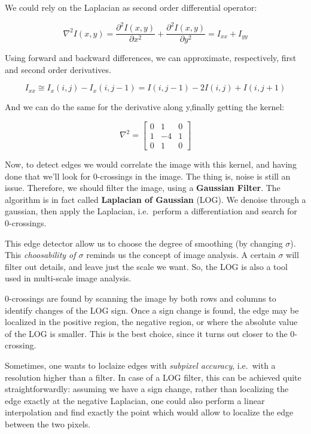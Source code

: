 \documentclass{article}
\begin{document}
We could rely on the Laplacian as second order differential operator:

\[
\nabla^{2} I(x, y)=\frac{\partial^{2} I(x, y)}{\partial x^{2}}+\frac{\partial^{2} I(x, y)}{\partial y^{2}}=I_{x x}+I_{y y}
\]

Using forward and backward differences, we can approximate,
respectively, first and second order derivatives.

\[
I_{x x} \cong I_{x}(i, j)-I_{x}(i, j-1)=I(i, j-1)-2 I(i, j)+I(i, j+1)
\]

And we can do the same for the derivative along y,finally getting the
kernel:

\[
\nabla^{2}=\left[\begin{array}{ccc}
0 & 1 & 0 \\
1 & -4 & 1 \\
0 & 1 & 0
\end{array}\right]
\]

Now, to detect edges we would correlate the image with this kernel, and
having done that we'll look for 0-crossings in the image. The thing is,
noise is still an issue. Therefore, we should filter the image, using a
\textbf{Gaussian Filter}. The algorithm is in fact called
\textbf{Laplacian of Gaussian} (LOG). We denoise through a gaussian,
then apply the Laplacian, i.e.~perform a differentiation and search for
0-crossings.

This edge detector allow us to choose the degree of smoothing (by
changing \(\sigma\)). This \emph{choosability of \(\sigma\)} reminds us
the concept of image analysis. A certain \(\sigma\) will filter out
details, and leave just the scale we want. So, the LOG is also a tool
used in multi-scale image analysis.

0-crossings are found by scanning the image by both rows and columns to
identify changes of the LOG sign. Once a sign change is found, the edge
may be localized in the positive region, the negative region, or where
the absolute value of the LOG is smaller. This is the best choice, since
it turns out closer to the 0-crossing.

Sometimes, one wants to loclaize edges with \emph{subpixel accuracy},
i.e.~with a resolution higher than a filter. In case of a LOG filter,
this can be achieved quite straightforwardly: assuming we have a sign
change, rather than localizing the edge exactly at the negative
Laplacian, one could also perform a linear interpolation and find
exactly the point which would allow to localize the edge between the two
pixels.
\end{document}

